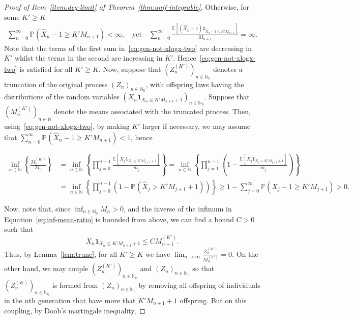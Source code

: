\documentclass[12pt]{article}
\theoremstyle{definition}
\newcommand{\E}[2][]{\ensuremath{\mathbb{E}_{#1}\left[#2 \right]}}
\newcommand{\Prob}[2][]{\ensuremath{\mathbb{P}_{#1} \left(#2 \right)}}
\begin{document}
\begin{proof}[Proof of Item~\ref{item:deg-limit} of Theorem~\ref{thm:unif-integrable}]
Otherwise, for some $K' \geq K$
\begin{align}  \label{eq:gen-not-xlogx-two} 
\sum_{n=0}^{\infty} \Prob{\widehat{X}_{n} - 1\geq K' M_{n+1}} < \infty, \quad \text{yet} \quad \sum_{n=0}^{\infty} \frac{\E{\left(\widehat{X}_{n} - 1 \right)\mathbf{1}_{\widehat{X}_n -1 \leq K' M_{n+1}}}}{M_{n+1}} = \infty. 
\end{align}
Note that the terms of the first sum in~\eqref{eq:gen-not-xlogx-two} are decreasing in $K'$ whilst the terms in the second are increasing in $K'$. Hence~\eqref{eq:gen-not-xlogx-two} is satisfied for all $K' \geq K$. Now, suppose that $(Z_{n}^{(K')})_{n \in \mathbb{N}_0}$ denotes a truncation of the original process $(Z_{n})_{n \in \mathbb{N}_0}$, with offspring laws having the distributions of the random variables $(X_{n}\mathbf{1}_{X_{n} \leq K' M_{n+1} + 1})_{n \in \mathbb{N}_0}$. Suppose that $(M^{(K')}_{n})_{n \in \mathbb{N}}$ denote the means associated with the truncated process. Then, using~\eqref{eq:gen-not-xlogx-two}, by making $K'$ larger if necessary, we may assume that $\sum_{n=0}^{\infty} \Prob{\widehat{X}_{n} - 1\geq K' M_{n+1}} < 1$, hence
\begin{linenomath}
\begin{align} \label{eq:inf-mean-ratio}
 \inf_{n \in \mathbb{N}} \left\{\frac{M_{n}^{(K')}}{M_n}\right\} & = \inf_{n \in \mathbb{N}} \left\{\prod_{j=0}^{n-1} \frac{\E{X_{j} \mathbf{1}_{X_{j} \leq K' M_{j+1}+1}}}{m_j} \right\}  = \inf_{n \in \mathbb{N}} \left\{ \prod_{j=1}^{n-1} \left(1 - \frac{\E{X_{j} \mathbf{1}_{X_j > K' M_{j+1} +1}}}{m_j}\right)\right\}
\\ \nonumber & = \inf_{n \in \mathbb{N}} \left\{ \prod_{j=0}^{n-1} \left(1 - \Prob{\widehat{X}_{j} > K' M_{j+1} + 1}\right) \right\} \geq 1 - \sum_{j=0}^{\infty} \Prob{\widehat{X}_{j} - 1\geq K' M_{j+1}} > 0.  
\end{align}
\end{linenomath}
Now, note that, since $\inf_{n \in \mathbb{N}_0} M_{n} > 0$, and the inverse of the infimum in Equation~\eqref{eq:inf-mean-ratio} is bounded from above, we can find a bound $C > 0$ such that
\[
X_{n} \mathbf{1}_{X_{n} \leq K' M_{n+1} + 1} \leq C M^{(K')}_{n+1}.  
\]
Thus, by Lemma~\ref{lem:trunc}, for all $K' \geq K$ we have $\lim_{n \to \infty} \frac{Z^{(K')}_n}{M^{(K')}_n} = 0$. 
On the other hand, we may couple $(Z_{n}^{(K')})_{n \in \mathbb{N}_0}$ and $(Z_{n})_{n \in \mathbb{N}_0}$ so that $(Z_{n}^{(K)})_{n \in \mathbb{N}_0}$ is formed from $(Z_{n})_{n \in \mathbb{N}_0}$ by removing all offspring of individuals in the $n$th generation that have more that $K'M_{n+1} + 1$ offspring. But on this coupling, by Doob's martingale inequality, 

\end{proof}
\end{document}
